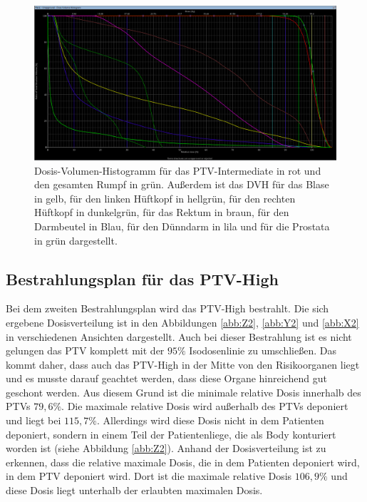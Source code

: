 \begin{figure}[H]
  \centering
  \includegraphics[width=\textwidth]{Bilder/Prostata1_DVH.png}
  \caption{Dosis-Volumen-Histogramm für das PTV-Intermediate in rot und den gesamten Rumpf in grün. Außerdem ist das DVH für das Blase in gelb, für den linken Hüftkopf in hellgrün, für den rechten Hüftkopf in dunkelgrün, für das Rektum in braun, für den Darmbeutel in Blau, für den Dünndarm in lila und für die Prostata in grün dargestellt.}
  \label{abb:DVH1}
\end{figure}


\subsection*{Bestrahlungsplan für das PTV-High}

Bei dem zweiten Bestrahlungsplan wird das PTV-High bestrahlt. Die sich ergebene Dosisverteilung
ist in den Abbildungen \ref{abb:Z2}, \ref{abb:Y2} und \ref{abb:X2} in verschiedenen
Ansichten dargestellt. Auch bei dieser Bestrahlung ist es nicht gelungen das PTV komplett
mit der $95\%$ Isodosenlinie zu umschließen. Das kommt daher, dass auch das PTV-High in der
Mitte von den Risikoorganen liegt und es musste darauf geachtet werden, dass diese Organe hinreichend
gut geschont werden. Aus diesem Grund ist die minimale relative Dosis innerhalb des PTVs
$79,6\%$. Die maximale relative Dosis wird außerhalb des PTVs deponiert und liegt
bei $115,7\%$. Allerdings wird diese Dosis nicht in dem Patienten deponiert, sondern in einem
Teil der Patientenliege, die als Body konturiert worden ist (siehe Abbildung \ref{abb:Z2}).
Anhand der Dosisverteilung ist zu erkennen, dass die relative maximale Dosis, die in dem
Patienten deponiert wird, in dem PTV deponiert wird. Dort ist die maximale relative Dosis
$106,9\%$ und diese Dosis liegt unterhalb der erlaubten maximalen Dosis.

